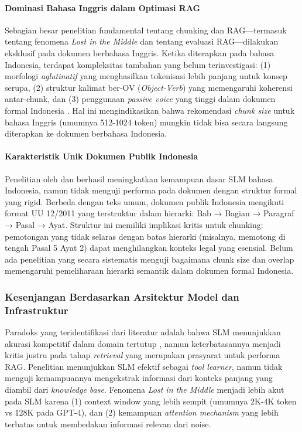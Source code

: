 \paragraph{Dominasi Bahasa Inggris dalam Optimasi RAG}
Sebagian besar penelitian fundamental tentang chunking dan RAG—termasuk \cite{Liu2023LostIT} tentang fenomena \textit{Lost in the Middle} dan \cite{es2024ragas} tentang evaluasi RAG—dilakukan eksklusif pada dokumen berbahasa Inggris. Ketika diterapkan pada bahasa Indonesia, terdapat kompleksitas tambahan yang belum terinvestigasi: (1) morfologi \textit{aglutinatif} yang menghasilkan tokenisasi lebih panjang untuk konsep serupa, (2) struktur kalimat ber-OV (\textit{Object-Verb}) yang memengaruhi koherensi antar-chunk, dan (3) penggunaan \textit{passive voice} yang tinggi dalam dokumen formal Indonesia \citep{cahyawijaya2021indonlg}. Hal ini mengindikasikan bahwa rekomendasi \textit{chunk size} untuk bahasa Inggris (umumnya 512-1024 token) mungkin tidak bisa secara langsung diterapkan ke dokumen berbahasa Indonesia.

\paragraph{Karakteristik Unik Dokumen Publik Indonesia}
Penelitian oleh \cite{cahyawijaya2024cendol} dan \cite{ng2025sealion} berhasil meningkatkan kemampuan dasar SLM bahasa Indonesia, namun tidak menguji performa pada dokumen dengan struktur formal yang rigid. Berbeda dengan teks umum, dokumen publik Indonesia mengikuti format UU 12/2011 yang terstruktur dalam hierarki: Bab → Bagian → Paragraf → Pasal → Ayat. Struktur ini memiliki implikasi kritis untuk chunking: pemotongan yang tidak selaras dengan batas hierarki (misalnya, memotong di tengah Pasal 5 Ayat 2) dapat menghilangkan konteks legal yang esensial. Belum ada penelitian yang secara sistematis menguji bagaimana chunk size dan overlap memengaruhi pemeliharaan hierarki semantik dalam dokumen formal Indonesia.

\subsubsection{Kesenjangan Berdasarkan Arsitektur Model dan Infrastruktur}

Paradoks yang teridentifikasi dari literatur adalah bahwa SLM menunjukkan akurasi kompetitif dalam domain tertutup \citep{hong2025innovative, lee2024logic}, namun keterbatasannya menjadi kritis justru pada tahap \textit{retrieval} yang merupakan prasyarat untuk performa RAG. Penelitian \cite{shen2024small} menunjukkan SLM efektif sebagai \textit{tool learner}, namun tidak menguji kemampuannya mengekstrak informasi dari konteks panjang yang diambil dari \textit{knowledge base}. Fenomena \textit{Lost in the Middle} \citep{Liu2023LostIT} menjadi lebih akut pada SLM karena (1) context window yang lebih sempit (umumnya 2K-4K token vs 128K pada GPT-4), dan (2) kemampuan \textit{attention mechanism} yang lebih terbatas untuk membedakan informasi relevan dari noise.

